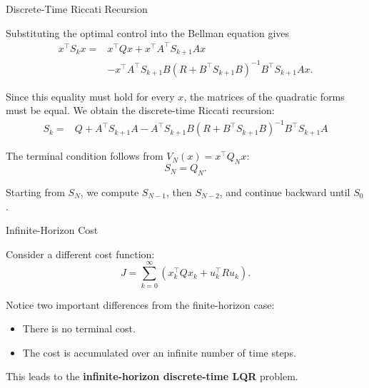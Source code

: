 \documentclass{beamer}
\begin{document}
\begin{frame}{Discrete-Time Riccati Recursion}
	\begin{flushleft}
		
		Substituting the optimal control into the Bellman
		equation gives
		\[
		\begin{aligned}
			x^\top S_kx
			={}&x^\top Qx+x^\top A^\top S_{k+1}Ax\\
			&-x^\top A^\top S_{k+1}B (R+B^\top S_{k+1}B)^{-1} B^\top S_{k+1}Ax.
		\end{aligned}
		\]
		
		\medskip
		
		Since this equality must hold for every $x$, the
		matrices of the quadratic forms must be equal.
		We obtain the discrete-time Riccati recursion:
		\[
		\boxed{
			\begin{aligned}
				S_k={}&Q+A^\top S_{k+1}A-A^\top S_{k+1}B
				(R+B^\top S_{k+1}B)^{-1} B^\top S_{k+1}A
			\end{aligned}
		}
		\]
		
		\medskip
		
		The terminal condition follows from
		$V_N(x)=x^\top Q_Nx$:
		\[
		S_N=Q_N.
		\]
		
		Starting from $S_N$, we compute $S_{N-1}$,
		then $S_{N-2}$, and continue backward until $S_0$.
		
	\end{flushleft}
\end{frame}




\begin{frame}{Infinite-Horizon Cost}
	\begin{flushleft}
		
		Consider a different cost function:
		\[
		J=\sum_{k=0}^{\infty}
		\left(x_k^\top Qx_k+u_k^\top Ru_k\right).
		\]
		
		\medskip
		
		Notice two important differences from the finite-horizon
		case:
		\begin{itemize}
			\item There is no terminal cost.
			\item The cost is accumulated over an infinite
			number of time steps.
		\end{itemize}
		
		\medskip
		
		This leads to the \textbf{infinite-horizon
			discrete-time LQR} problem.
		
	\end{flushleft}
\end{frame}
\end{document}
